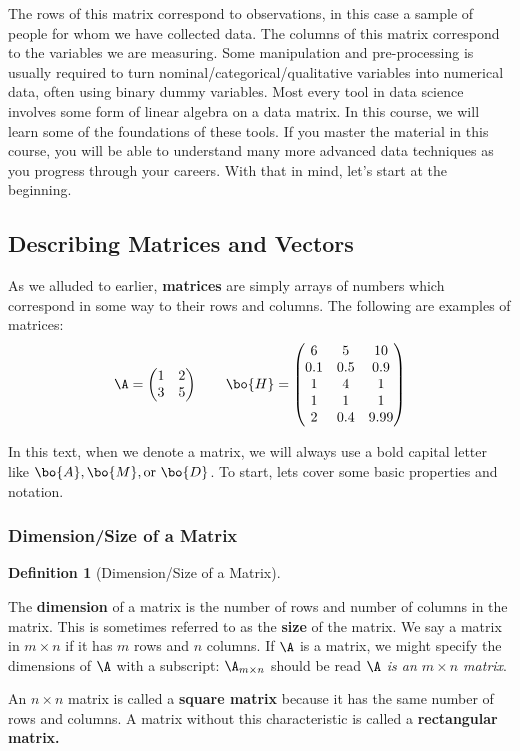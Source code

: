 \documentclass[
]{article}
\theoremstyle{definition}
\newtheorem{definition}{Definition}[section]
\theoremstyle{definition}
\theoremstyle{definition}
\theoremstyle{definition}
\theoremstyle{remark}
\begin{document}
The rows of this matrix correspond to observations, in this case a sample of people for whom we have collected data. The columns of this matrix correspond to the variables we are measuring. Some manipulation and pre-processing is usually required to turn nominal/categorical/qualitative variables into numerical data, often using binary dummy variables. Most every tool in data science involves some form of linear algebra on a data matrix. In this course, we will learn some of the foundations of these tools. If you master the material in this course, you will be able to understand many more advanced data techniques as you progress through your careers. With that in mind, let's start at the beginning.

\hypertarget{describing-matrices-and-vectors}{%
\subsection{Describing Matrices and Vectors}\label{describing-matrices-and-vectors}}

As we alluded to earlier, \textbf{matrices} are simply arrays of numbers which correspond in some way to their rows and columns. The following are examples of matrices:
\[\A=\left(\begin{matrix} 1 & 2\\3&5 \end{matrix}\right) \qquad \bo{H}= \left(\begin{matrix} 6 & 5& 10\\0.1 & 0.5 & 0.9\\1&4&1\\1&1&1\\2&0.4&9.99 \end{matrix}\right)\]

In this text, when we denote a matrix, we will always use a bold capital letter like \(\bo{A}, \bo{M}, \mbox{or } \bo{D}\). To start, lets cover some basic properties and notation.

\hypertarget{dimensionsize-of-a-matrix}{%
\subsubsection{Dimension/Size of a Matrix}\label{dimensionsize-of-a-matrix}}

\begin{definition}[Dimension/Size of a Matrix]
\protect\hypertarget{def:dim}{}\label{def:dim}

The \textbf{dimension} of a matrix is the number of rows and number of columns in the matrix. This is sometimes referred to as the \textbf{size} of the matrix. We say a matrix in \(m\times n\) if it has \(m\) rows and \(n\) columns. If \(\A\) is a matrix, we might specify the dimensions of \(\A\) with a subscript: \(\A_{m\times n}\) should be read \emph{\(\A\) is an \(m\times n\) matrix}.

An \(n\times n\) matrix is called a \textbf{square matrix} because it has the same number of rows and columns. A matrix without this characteristic is called a \textbf{rectangular matrix.}

\end{definition}
\end{document}
